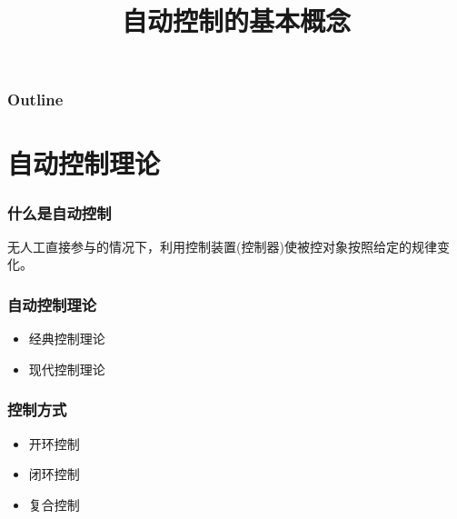 \documentclass{beamer}
\title{自动控制的基本概念}
\author{}
\date{}
\begin{document}
\maketitle

\begin{frame}
\frametitle{Outline}
\setcounter{tocdepth}{3}
\tableofcontents
\end{frame}














\section{自动控制理论}
\label{sec-1}
\begin{frame}
\frametitle{什么是自动控制}
\label{sec-1-1}

 无人工直接参与的情况下，利用控制装置(控制器)使被控对象按照给定的规律变化。
\end{frame}
\begin{frame}
\frametitle{自动控制理论}
\label{sec-1-2}

\begin{itemize}
\item <2->经典控制理论
\item <3->现代控制理论
\end{itemize}
\end{frame}
\begin{frame}
\frametitle{控制方式}
\label{sec-1-3}

\begin{itemize}
\item 开环控制
\item 闭环控制
\item 复合控制
\end{itemize}
\end{frame}
\end{document}
